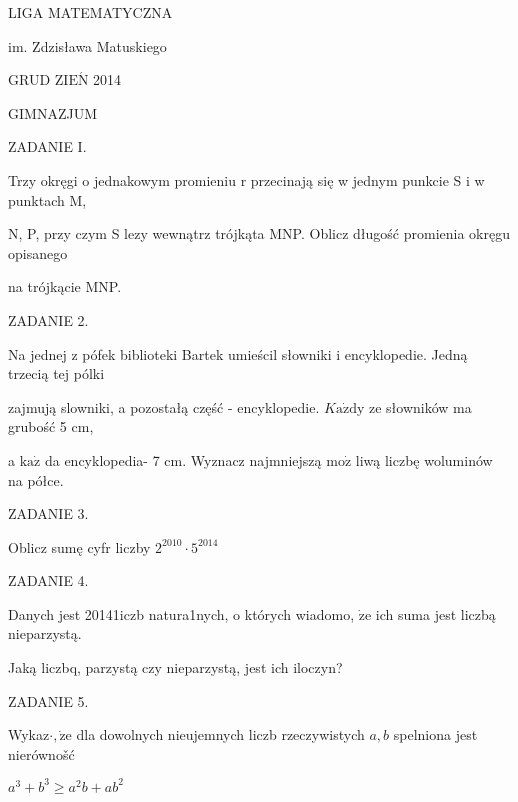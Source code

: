 \documentclass[a4paper,12pt]{article}
\begin{document}
LIGA MATEMATYCZNA

im. Zdzisława Matuskiego

GRUD Z$\mathrm{I}\mathrm{E}\acute{\mathrm{N}}$ 2014

GIMNAZJUM

ZADANIE I.

Trzy okręgi o jednakowym promieniu r przecinają się w jednym punkcie S i w punktach M,

N, P, przy czym S lezy wewnątrz trójkąta MNP. Oblicz długość promienia okręgu opisanego

na trójkącie MNP.

ZADANIE 2.

Na jednej z pófek biblioteki Bartek umieścil słowniki i encyklopedie. Jedną trzecią tej pólki

zajmują slowniki, a pozostałą część - encyklopedie. $K\mathrm{a}\dot{\mathrm{z}}\mathrm{d}\mathrm{y}$ ze słowników ma grubość 5 cm,

a $\mathrm{k}\mathrm{a}\dot{\mathrm{z}}$ da encyklopedia- 7 cm. Wyznacz najmniejszą $\mathrm{m}\mathrm{o}\dot{\mathrm{z}}$ liwą liczbę woluminów na półce.

ZADANIE 3.

Oblicz sumę cyfr liczby $2^{2010}\cdot 5^{2014}$

ZADANIE 4.

Danych jest 20141iczb natura1nych, o których wiadomo, $\dot{\mathrm{z}}\mathrm{e}$ ich suma jest liczbą nieparzystą.

Jaką liczbq, parzystą czy nieparzystą, jest ich iloczyn?

ZADANIE 5.

Wykaz$\cdot, \dot{\mathrm{z}}\mathrm{e}$ dla dowolnych nieujemnych liczb rzeczywistych $a, b$ spelniona jest nierównošć

$a^{3}+b^{3}\geq a^{2}b+ab^{2}$
\end{document}
